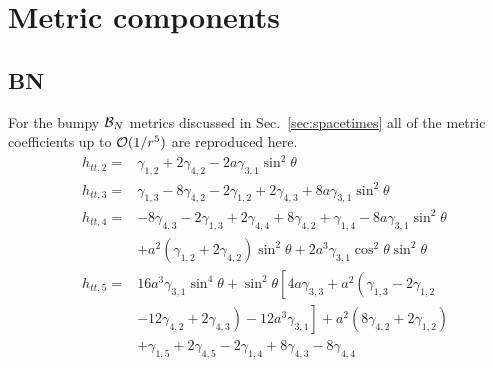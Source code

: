 \appendix
\section{Metric components}\label{app:a}
\subsection{BN}\label{subsec:BNcomponents}
For the bumpy ${\cal{B}}_{N}$ metrics discussed in Sec.\ \ref{sec:spacetimes} all of the metric coefficients up to ${\cal{O}}(1/r^{5})$ are reproduced here.
\begin{eqnarray}
&h_{tt,2}=&\gamma_{1,2}+2\gamma_{4,2}-2a\gamma_{3,1}\sin^{2}\theta \label{eq:bigEqstart}\nonumber\\
&h_{tt,3}=&\gamma_{1,3}-8\gamma_{4,2}-2\gamma_{1,2}+2\gamma_{4,3}+8a\gamma_{3,1}\sin^{2}\theta \nonumber\\
&h_{tt,4}= & -8\gamma_{4,3}-2\gamma_{1,3}+2\gamma_{4,4}+8\gamma_{4,2}+\gamma_{1,4}-8a\gamma_{3,1}\sin^{2}\theta  \nonumber\\
         & & +a^{2}\left(\gamma_{1,2}+2\gamma_{4,2}\right)\sin^{2}\theta+2a^{3}\gamma_{3,1}\cos^{2}\theta \sin^{2}\theta \nonumber\\
&h_{tt,5}= & 16a^{3}\gamma_{3,1}\sin^{4}\theta + \sin^{2}\theta \left[ 4a\gamma_{3,3}+a^{2}\left(\gamma_{1,3}-2\gamma_{1,2}  \right.\right. \nonumber \\
&&\left.\left.-12\gamma_{4,2}+2\gamma_{4,3}\right)-12a^{3}\gamma_{3,1} \right] +a^{2}\left(8\gamma_{4,2}+2\gamma_{1,2}\right) \nonumber\\
&  &  + \gamma_{1,5} +2\gamma_{4,5}-2\gamma_{1,4}+8\gamma_{4,3}-8\gamma_{4,4} 
\end{eqnarray}
